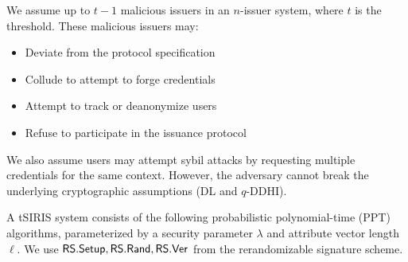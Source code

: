 We assume up to $t-1$ malicious issuers in an $n$-issuer system, where $t$ is the threshold. These malicious issuers may:
\begin{itemize}
    \item Deviate from the protocol specification
    \item Collude to attempt to forge credentials
    \item Attempt to track or deanonymize users
    \item Refuse to participate in the issuance protocol
\end{itemize}

We also assume users may attempt sybil attacks by requesting multiple credentials for the same context. However, the adversary cannot break the underlying cryptographic assumptions (DL and $q$-DDHI).

A tSIRIS system consists of the following probabilistic polynomial-time (PPT) algorithms, parameterized by a security parameter $\lambda$ and attribute vector length $\ell$. We use $\mathsf{RS.Setup}, \mathsf{RS.Rand}, \mathsf{RS.Ver}$ from the rerandomizable signature scheme.

